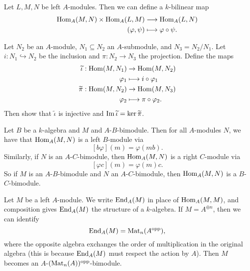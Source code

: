\begin{remark}
  Let $L, M, N$ be left $A$-modules. Then
  we can define a $k$-bilinear map
  \begin{align*}
    \operatorname{Hom}_A(M, N) \times \operatorname{Hom}_A(L, M) &\longrightarrow \operatorname{Hom}_A(L, N) \\
    (\varphi, \psi) &\longmapsto \varphi \circ \psi.
  \end{align*}
\end{remark}

\begin{exercise}
  Let $N_2$ be an $A$-module,
  $N_1 \subseteq N_2$ an $A$-submodule,
  and $N_3 = N_2 / N_1$. Let
  $i : N_1 \hookrightarrow N_2$ be the
  inclusion and $\pi : N_2 \to N_3$ the
  projection. Define the maps
  \begin{align*}
    \widetilde{\iota} : \operatorname{Hom}(M, N_1) &\rightarrow \operatorname{Hom}(M, N_2) \\
    \varphi_1 &\longmapsto i \circ \varphi_1 \\
    \widetilde{\pi} : \operatorname{Hom}(M, N_2) &\rightarrow \operatorname{Hom}(M, N_3) \\
    \varphi_2 &\longmapsto \pi \circ \varphi_2.
  \end{align*}
  Then show that $\widetilde{\iota}$
  is injective and $\operatorname{Im} \widetilde{\iota} = \ker \widetilde{\pi}$.
\end{exercise}

\begin{remark}
  Let $B$ be a $k$-algebra and $M$ and
  $A$-$B$-bimodule. Then for all
  $A$-modules $N$, we have that
  $\operatorname{Hom}_A(M, N)$
  is a left $B$-module via
  \[
    [b \varphi](m) = \varphi(mb).
  \]
  Similarly, if $N$ is an
  $A$-$C$-bimodule, then
  $\operatorname{Hom}_A(M, N)$ is a right $C$-module
  via
  \[
    [\varphi c](m) = \varphi(m)c.
  \]
  So if $M$ is an $A$-$B$-bimodule
  and $N$ an $A$-$C$-bimodule,
  then $\operatorname{Hom}_A(M, N)$ is a $B$-$C$-bimodule.
\end{remark}

\begin{remark}
  Let $M$ be a left $A$-module.
  We write $\operatorname{End}_A(M)$ in place of
  $\operatorname{Hom}_A(M, M)$, and composition gives
  $\operatorname{End}_A(M)$ the structure of a
  $k$-algebra. If $M = A^{\oplus n}$,
  then we can identify
  \[
    \operatorname{End}_A(M) = \operatorname{Mat}_n(A^{\mathrm{opp}}),
  \]
  where the opposite algebra exchanges
  the order of multiplication in the
  original algebra (this is because
  $\operatorname{End}_A(M)$ must respect the action by
  $A$). Then
  $M$ becomes an
  $A$-$(\operatorname{Mat}_n(A))^{\mathrm{opp}}$-bimodule.
\end{remark}

